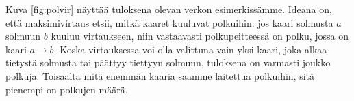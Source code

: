 Kuva \ref{fig:polvir} näyttää tuloksena olevan verkon
esimerkissämme.
Ideana on, että maksimivirtaus etsii,
mitkä kaaret kuuluvat polkuihin:
jos kaari solmusta $a$ solmuun $b$ kuuluu virtaukseen,
niin vastaavasti polkupeitteessä on polku,
jossa on kaari $a \rightarrow b$.
Koska virtauksessa voi olla valittuna vain yksi kaari,
joka alkaa tietystä solmusta tai päättyy tiettyyn solmuun,
tuloksena on varmasti joukko polkuja.
Toisaalta mitä enemmän kaaria saamme laitettua polkuihin,
sitä pienempi on polkujen määrä.
